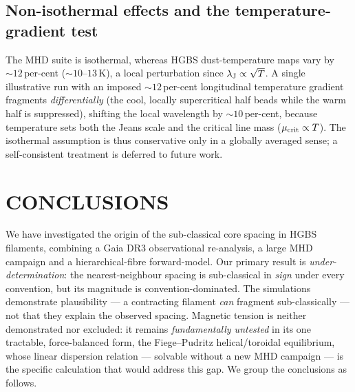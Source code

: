 \documentclass[usenatbib,twoside,twocolumn]{mnras}
\begin{document}
\subsection{Non-isothermal effects and the temperature-gradient test}
\label{sec:mt_variation}

The MHD suite is isothermal, whereas HGBS dust-temperature maps vary by $\sim12$\,per-cent ($\sim10$--$13$\,K), a local perturbation since $\lambda_{\rm J}\propto\sqrt{T}$. A single illustrative run with an imposed $\sim12$\,per-cent longitudinal temperature gradient fragments \emph{differentially} (the cool, locally supercritical half beads while the warm half is suppressed), shifting the local wavelength by $\sim10$\,per-cent, because temperature sets both the Jeans scale and the critical line mass ($\mu_{\rm crit}\propto T$). The isothermal assumption is thus conservative only in a globally averaged sense; a self-consistent treatment is deferred to future work.


\section{CONCLUSIONS}

We have investigated the origin of the sub-classical core spacing in HGBS filaments, combining a Gaia DR3 observational re-analysis, a large MHD campaign and a hierarchical-fibre forward-model. Our primary result is \emph{under-determination}: the nearest-neighbour spacing is sub-classical in \emph{sign} under every convention, but its magnitude is convention-dominated. The simulations demonstrate plausibility --- a contracting filament \emph{can} fragment sub-classically --- not that they explain the observed spacing. Magnetic tension is neither demonstrated nor excluded: it remains \emph{fundamentally untested} in its one tractable, force-balanced form, the Fiege--Pudritz helical/toroidal equilibrium, whose linear dispersion relation --- solvable without a new MHD campaign --- is the specific calculation that would address this gap. We group the conclusions as follows.
\end{document}
